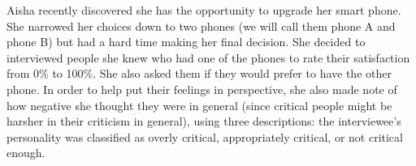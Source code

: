 \documentclass[addpoints]{examsetup}
\begin{document}
\begin{questions}

\pagebreak
\question

Aisha recently discovered she has the opportunity to upgrade her smart phone.
She narrowed her choices down to two phones (we will call them phone A and phone B) but had a hard time making her final decision.
She decided to interviewed people she knew who had one of the phones to rate their satisfaction from 0\% to 100\%.
She also asked them if they would prefer to have the other phone.
In order to help put their feelings in perspective, she also made note of how negative she thought they were in general (since critical people might be harsher in their criticism in general),
using three descriptions: the interviewee's personality was classified as overly critical, appropriately critical, or not critical enough. 

\end{questions}
\end{document}
